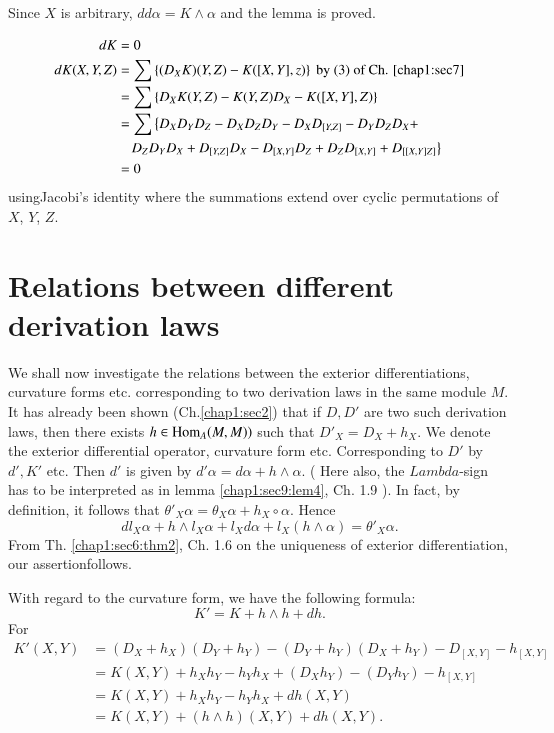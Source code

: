 Since  $X$ is arbitrary, $ dd \alpha = K \wedge \alpha $ and the lemma
is proved. 

\begin{lem}\label{chap1:sec9:lem6} %
  \begin{align*}
    dK &= 0 \\
    dK ( X,Y,Z ) &= \sum \left \{ ( D_X K ) ( Y,Z )-K ( [ X,Y ], z )
    \right\} \text{ by  (3)  of  Ch. \ref{chap1:sec7}} \\ 
    &= \sum \left\{ D_X K ( Y,Z )-K ( Y,Z ) D_X  - K ( [ X,Y ], Z ) \right\}\\
    &= \sum \left\{ D_X D_Y D_Z  - D_X D_Z D_Y - D_X D_{[ Y,Z ]} - D_Y
    D_Z D_X + \right.\\
    & ~~~\left. D_Z D_Y D_X + D_{[ Y,Z]} D_X -D_{[ X,Y ]} D_Z + D_Z D_{[
        X,Y ]} + D_{[[ X,Y ] Z]}\right\} \\ 
    &=  0 
  \end{align*}
using\pageoriginale Jacobi's identity where the summations  extend
      over cyclic permutations of  $X$, $Y$, $Z$.  
\end{lem}

\section{Relations between different derivation
  laws}\label{chap1:sec10} %

We shall now investigate the relations between the exterior
differentiations, curvature forms etc. corresponding to two derivation
laws in the same module $M$. It has already been shown (Ch.\ref{chap1:sec2}) 
that  if  $ D,D' $ are two such derivation laws, then there exists $ h
\in \operatorname{Hom}_A ( M,M )) $ such that $ D'_X = D_X + h_X $. We denote the
exterior differential operator, curvature form etc. Corresponding to $
D' $ by $ d', K' $ etc. Then $d'$ is given by $ d '\alpha = d \alpha +
h \wedge \alpha $. ( Here also, the  $Lambda$-sign has to be interpreted as
in lemma \ref{chap1:sec9:lem4}, Ch. 1.9 ). In fact, by definition, it follows that $
\theta'_X \alpha = \theta_X \alpha  + h_X \circ \alpha $. Hence  
$$
d l_X \alpha + h \wedge l_X \alpha  + l_X d \alpha + l_X ( h \wedge
\alpha ) = \theta'_X \alpha.  
$$
From Th. \ref{chap1:sec6:thm2}, Ch. 1.6  on the uniqueness of exterior differentiation, 
our assertion\pageoriginale follows.    

With regard to the curvature form, we have the following  formula:  
$$
K' = K + h \wedge h + dh. 
$$
For
\begin{align*}
 K' (X,Y) &= ( D_X + h_X ) ( D_Y +h_Y ) - ( D_Y + h_Y )(
  D_X + h_Y ) - D_{[ X,Y ]} - h_{[ X,Y ]} \\ 
  &=  K( X,Y ) + h_X h_Y - h_Y h_X + ( D_X h_Y ) - ( D_Y h_Y )- h_{[ X,Y ]} \\
  &= K ( X,Y ) + h_X h_Y - h_Y h_X + dh ( X,Y ) \\
  &= K ( X,Y ) + ( h \wedge h ) ( X,Y ) + dh ( X,Y ).
\end{align*}

